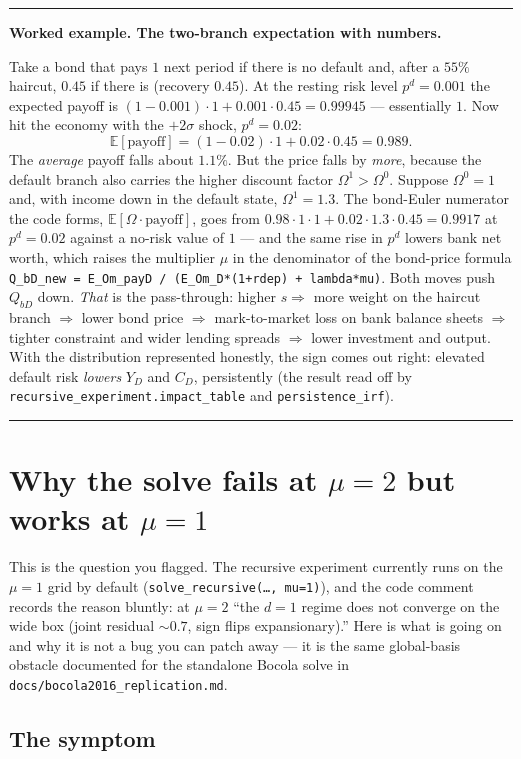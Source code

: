 \documentclass[11pt]{article}
\newcommand{\demohead}[1]{\par\smallskip\noindent%
  \textcolor{democ}{\rule{\linewidth}{0.7pt}}\par\nobreak\vspace{2pt}%
  \noindent\textbf{\textcolor{democ}{Worked example.} #1}\par\nobreak\vspace{2pt}}
\newcommand{\demofoot}{\par\vspace{2pt}\noindent%
  \textcolor{democ}{\rule{\linewidth}{0.7pt}}\par\smallskip}
\newcommand{\E}{\mathbb{E}}
\newcommand{\code}[1]{\texttt{#1}}
\begin{document}
\demohead{The two-branch expectation with numbers.}
Take a bond that pays $1$ next period if there is no default and, after a
$55\%$ haircut, $0.45$ if there is (recovery $0.45$). At the resting risk
level $p^d=0.001$ the expected payoff is
$(1-0.001)\cdot1+0.001\cdot0.45=0.99945$ --- essentially $1$. Now hit the
economy with the $+2\sigma$ shock, $p^d=0.02$:
\[
\E[\text{payoff}]=(1-0.02)\cdot1+0.02\cdot0.45=0.989.
\]
The \emph{average} payoff falls about $1.1\%$. But the price falls by
\emph{more}, because the default branch also carries the higher discount
factor $\Omega^1>\Omega^0$. Suppose $\Omega^0=1$ and, with income down in the
default state, $\Omega^1=1.3$. The bond-Euler numerator the code forms,
$\E[\Omega\cdot\text{payoff}]$, goes from
$0.98\cdot1\cdot1+0.02\cdot1.3\cdot0.45=0.9917$ at $p^d=0.02$ against a
no-risk value of $1$ --- and the same rise in $p^d$ lowers bank net worth,
which raises the multiplier $\mu$ in the denominator of the bond-price
formula \code{Q\_bD\_new = E\_Om\_payD / (E\_Om\_D*(1+rdep) + lambda*mu)}.
Both moves push $Q_{bD}$ down. \emph{That} is the pass-through: higher $s\Rightarrow$
more weight on the haircut branch $\Rightarrow$ lower bond price
$\Rightarrow$ mark-to-market loss on bank balance sheets $\Rightarrow$ tighter
constraint and wider lending spreads $\Rightarrow$ lower investment and
output. With the distribution represented honestly, the sign comes out right:
elevated default risk \emph{lowers} $Y_D$ and $C_D$, persistently
(the result read off by \code{recursive\_experiment.impact\_table} and
\code{persistence\_irf}).
\demofoot


\section{Why the solve fails at \texorpdfstring{$\mu=2$}{mu=2} but works at
\texorpdfstring{$\mu=1$}{mu=1}}
\label{sec:mu2}

This is the question you flagged. The recursive experiment currently runs on
the $\mu=1$ grid by default (\code{solve\_recursive(\dots, mu=1)}), and the
code comment records the reason bluntly: at $\mu=2$ ``the $d=1$ regime does
not converge on the wide box (joint residual $\sim0.7$, sign flips
expansionary).'' Here is what is going on and why it is not a bug you can
patch away --- it is the same global-basis obstacle documented for the
standalone Bocola solve in \code{docs/bocola2016\_replication.md}.

\subsection{The symptom}
\end{document}

